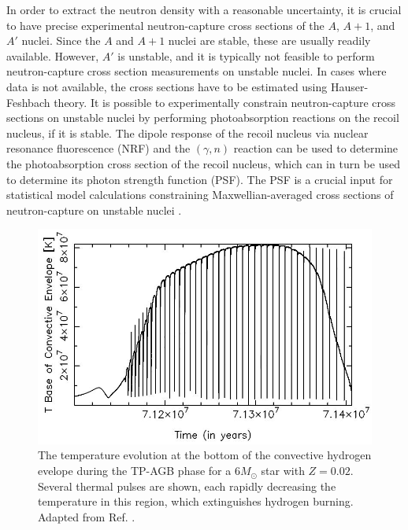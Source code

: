 In order to extract the neutron density with a reasonable uncertainty, it is crucial to have precise experimental neutron-capture cross sections of the $A$, $A+1$, and $A'$ nuclei. Since the $A$ and $A+1$ nuclei are stable, these are usually readily available. However, $A'$ is unstable, and it is typically not feasible to perform neutron-capture cross section measurements on unstable nuclei. In cases where data is not available, the cross sections have to be estimated using Hauser-Feshbach theory. It is possible to experimentally constrain neutron-capture cross sections on unstable nuclei by performing photoabsorption reactions on the recoil nucleus, if it is stable. The dipole response of the recoil nucleus via nuclear resonance fluorescence (NRF) and the $(\gamma,n)$ reaction can be used to determine the photoabsorption cross section of the recoil nucleus, which can in turn be used to determine its photon strength function (PSF). The PSF is a crucial input for statistical model calculations constraining Maxwellian-averaged cross sections of neutron-capture on unstable nuclei \cite{Wilhelmy2020}.



\begin{figure}[t]
\centering
\includegraphics[width=6.5in]{Chapter-1/figs/HBB.jpg}
\caption{\label{fig:HBB}The temperature evolution at the bottom of the convective hydrogen evelope during the TP-AGB phase for a $6 M_{\odot}$ star with $Z=0.02$. Several thermal pulses are shown, each rapidly decreasing the temperature in this region, which extinguishes hydrogen burning. Adapted from Ref. \cite{Karakas2014}.}
\end{figure}

